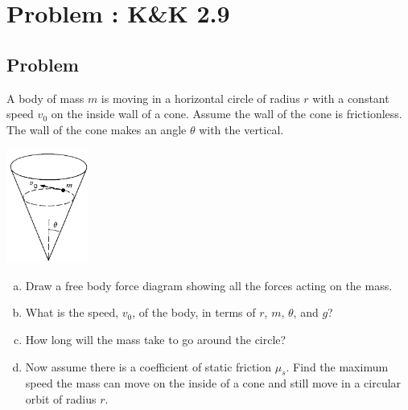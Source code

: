 \documentclass[solutions]{esg8012pset}
\begin{document}
\section{Problem \thesection: K\&K 2.9}
\subsection{Problem}
  A body of mass $m$ is moving in a horizontal circle of radius $r$ with a constant speed $v_0$ on the inside wall of a cone. Assume the wall of the cone is frictionless. The wall of the cone makes an angle $\theta$ with the vertical.
  \begin{center}\includegraphics[width=0.2\textwidth]{ps02_3}\end{center}
  \begin{enumerate}[a)]
    \item Draw a free body force diagram showing all the forces acting on the mass.
    \item What is the speed, $v_0$, of the body, in terms of $r$, $m$, $\theta$, and $g$?
    \item How long will the mass take to go around the circle?
    \item Now assume there is a coefficient of static friction $\mu_s$. Find the maximum speed the mass can move on the inside of a cone and still move in a circular orbit of radius $r$.
  \end{enumerate}
\end{document}
